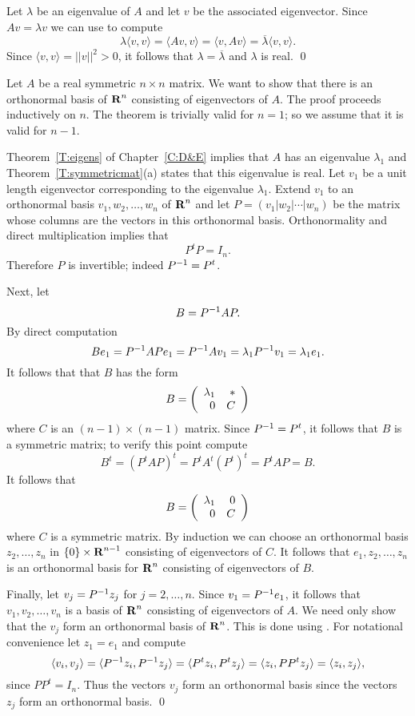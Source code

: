   Let $\lambda$
be an eigenvalue of $A$ and let $v$ be the associated eigenvector. Since
$Av=\lambda v$ we can use  to compute
\[
\lambda \langle v,v \rangle = \langle Av,v \rangle = \langle v,Av \rangle
= \overline{\lambda} \langle v,v \rangle.
\]
Since $\langle v,v \rangle = ||v||^2 > 0$, it follows that
$\lambda=\overline{\lambda}$ and $\lambda$ is real.  \qed


Let $A$ be a real symmetric $n\times n$ matrix.  We want to show that there
is an orthonormal basis of $\mbox{$\bf{R}$}^n$ consisting of eigenvectors of $A$.  The
proof proceeds inductively on $n$.   The theorem is trivially valid for
$n=1$; so we assume that it is valid for $n-1$.

Theorem~\ref{T:eigens} of Chapter~\ref{C:D&E} implies that $A$ has an 
eigenvalue $\lambda_1$ and Theorem~\ref{T:symmetricmat}(a) states that 
this eigenvalue is real.
Let $v_1$ be a unit length eigenvector corresponding to the eigenvalue
$\lambda_1$.  Extend $v_1$ to an orthonormal basis $v_1,w_2,\ldots,w_n$ of
$\mbox{$\bf{R}$}^n$ and let $P=(v_1|w_2|\cdots|w_n)$ be the matrix whose columns are the
vectors in this orthonormal basis.  Orthonormality and direct multiplication
implies that
\begin{equation}  \label{e:orthosym}
P^tP=I_n.
\end{equation}
Therefore $P$ is invertible; indeed $P^{-1}=P^t$.

Next, let
\[
B= P^{-1} AP.
\]
By direct computation
\[
Be_1 = P^{-1} APe_1 = P^{-1} Av_1 = \lambda_1 P^{-1} v_1=\lambda_1e_1.
\]
It follows that that $B$ has the form
\[
B = \left(\begin{array}{rr} \lambda_1 & *\\ 0 &C\end{array}\right)
\]
where $C$ is an $(n-1)\times (n-1)$ matrix.   Since $P^{-1}=P^t$, it follows
that $B$ is a symmetric matrix; to verify this point compute
\[
B^t = (P^t AP)^t = P^t A^t (P^t)^t = P^tAP = B.
\]
It follows that
\[
B =\left(\begin{array}{rr} \lambda_1 & 0\\ 0 &C\end{array}\right)
\]
where $C$ is a symmetric matrix.  By induction we can choose an orthonormal
basis $z_2,\ldots,z_n$ in $\{0\}\times\mbox{$\bf{R}$}^{n-1}$ consisting of eigenvectors
of $C$.  It follows that $e_1,z_2,\ldots,z_n$ is an orthonormal basis for
$\mbox{$\bf{R}$}^n$ consisting of eigenvectors of $B$.

Finally, let $v_j=P^{-1} z_j$ for $j=2,\ldots,n$.  Since $v_1=P^{-1} e_1$,
it follows that  $v_1,v_2,\ldots,v_n$ is a basis of $\mbox{$\bf{R}$}^n$ consisting of
eigenvectors of $A$.  We need only show that the $v_j$ form an orthonormal
basis of $\mbox{$\bf{R}$}^n$.   This is done using .  For notational
convenience let $z_1=e_1$ and compute
\[
\langle v_i,v_j \rangle  =\langle P^{-1} z_i,P^{-1} z_j\rangle =
\langle P^tz_i, P^tz_j \rangle = \langle z_i, PP^t z_j \rangle =
\langle z_i,z_j \rangle,
\]
since $PP^t= I_n$.  Thus the vectors $v_j$ form an orthonormal basis since
the vectors $z_j$ form an orthonormal basis.  \qed




